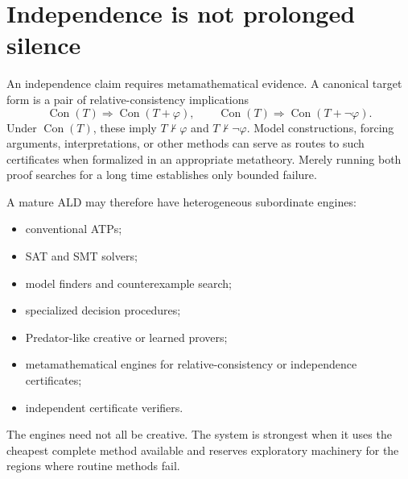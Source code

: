 \documentclass[11pt,oneside]{book}
\theoremstyle{definition}
\theoremstyle{remark}
\newcommand{\Con}{\operatorname{Con}}
\begin{document}
\section{Independence is not prolonged silence}
An independence claim requires metamathematical evidence. A canonical target form is a pair of relative-consistency implications
\[
\Con(T)\Rightarrow\Con(T+\varphi),
\qquad
\Con(T)\Rightarrow\Con(T+\neg\varphi).
\]
Under $\Con(T)$, these imply $T\nvdash\varphi$ and $T\nvdash\neg\varphi$. Model constructions, forcing arguments, interpretations, or other methods can serve as routes to such certificates when formalized in an appropriate metatheory. Merely running both proof searches for a long time establishes only bounded failure.

A mature ALD may therefore have heterogeneous subordinate engines:
\begin{itemize}
\item conventional ATPs;
\item SAT and SMT solvers;
\item model finders and counterexample search;
\item specialized decision procedures;
\item Predator-like creative or learned provers;
\item metamathematical engines for relative-consistency or independence certificates;
\item independent certificate verifiers.
\end{itemize}
The engines need not all be creative. The system is strongest when it uses the cheapest complete method available and reserves exploratory machinery for the regions where routine methods fail.
\end{document}
